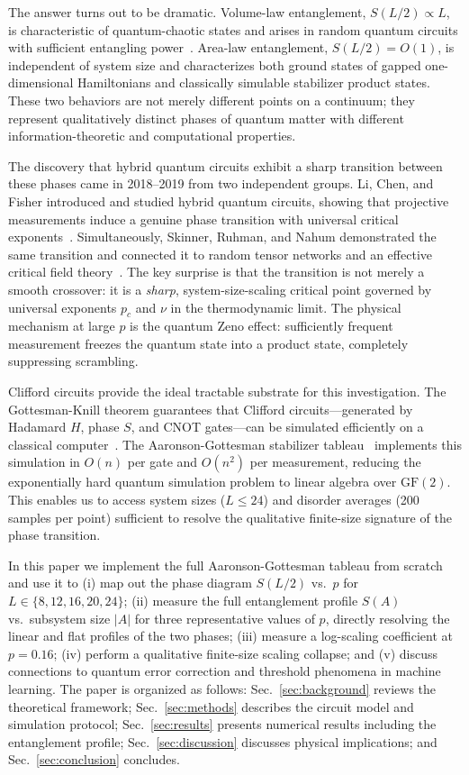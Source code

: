 \documentclass[twocolumn,prl,aps,floatfix]{revtex4-2}
\begin{document}
The answer turns out to be dramatic.
Volume-law entanglement, $S(L/2) \propto L$, is characteristic of quantum-chaotic
states and arises in random quantum circuits with sufficient entangling
power~\cite{Li2019}.
Area-law entanglement, $S(L/2) = O(1)$, is independent of system size and
characterizes both ground states of gapped one-dimensional Hamiltonians
and classically simulable stabilizer product states.
These two behaviors are not merely different points on a continuum; they represent
qualitatively distinct phases of quantum matter with different information-theoretic
and computational properties.

The discovery that hybrid quantum circuits exhibit a sharp transition between these
phases came in 2018--2019 from two independent groups.
Li, Chen, and Fisher introduced and studied hybrid quantum circuits, showing that
projective measurements induce a genuine phase transition with universal
critical exponents~\cite{Li2018,Li2019}.
Simultaneously, Skinner, Ruhman, and Nahum demonstrated the same transition and
connected it to random tensor networks and an effective critical field theory~\cite{Skinner2019}.
The key surprise is that the transition is not merely a smooth crossover:
it is a \textit{sharp}, system-size-scaling critical point governed by universal
exponents $p_c$ and $\nu$ in the thermodynamic limit.
The physical mechanism at large $p$ is the quantum Zeno effect:
sufficiently frequent measurement freezes the quantum state into a product state,
completely suppressing scrambling.

Clifford circuits provide the ideal tractable substrate for this investigation.
The Gottesman-Knill theorem guarantees that Clifford circuits---generated by
Hadamard $H$, phase $S$, and CNOT gates---can be simulated efficiently
on a classical computer~\cite{Gottesman1998}.
The Aaronson-Gottesman stabilizer tableau~\cite{Aaronson2004} implements this
simulation in $O(n)$ per gate and $O(n^2)$ per measurement, reducing the exponentially hard
quantum simulation problem to linear algebra over $\mathrm{GF}(2)$.
This enables us to access system sizes ($L \leq 24$) and disorder averages
(200 samples per point) sufficient to resolve the qualitative finite-size
signature of the phase transition.

In this paper we implement the full Aaronson-Gottesman tableau from scratch
and use it to (i) map out the phase diagram $S(L/2)$ vs.\ $p$ for
$L \in \{8,12,16,20,24\}$; (ii) measure the full entanglement profile
$S(A)$ vs.\ subsystem size $|A|$ for three representative values of $p$,
directly resolving the linear and flat profiles of the two phases;
(iii) measure a log-scaling coefficient at $p=0.16$;
(iv) perform a qualitative finite-size scaling collapse; and (v) discuss
connections to quantum error correction and threshold phenomena in machine
learning.
The paper is organized as follows: Sec.~\ref{sec:background} reviews the
theoretical framework; Sec.~\ref{sec:methods} describes the circuit model and
simulation protocol; Sec.~\ref{sec:results} presents numerical results
including the entanglement profile; Sec.~\ref{sec:discussion} discusses
physical implications; and Sec.~\ref{sec:conclusion} concludes.
\end{document}
